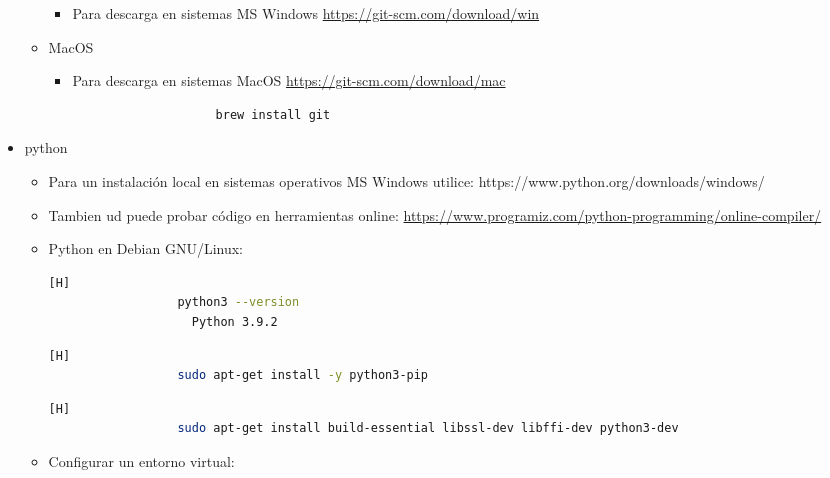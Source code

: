 \documentclass{article}
\begin{document}
\begin{itemize}
\begin{itemize}
            \begin{itemize}
                \item Para descarga en sistemas MS Windows \url{https://git-scm.com/download/win}
            \end{itemize}
            \item MacOS
            \begin{itemize}
                \item Para descarga en sistemas MacOS \url{https://git-scm.com/download/mac}
                \begin{lstlisting}
                    brew install git
                \end{lstlisting}
            \end{itemize}
        \end{itemize}
        \item python
        \begin{itemize}
            \item Para un instalación local en sistemas operativos MS Windows utilice: https://www.python.org/downloads/windows/
            \item Tambien ud puede probar código en herramientas online: \url{https://www.programiz.com/python-programming/online-compiler/}
            \item Python en Debian GNU/Linux:
            \begin{itemize}
            \begin{lstlisting}[language=bash,caption={Debian Linux viene con Python 3 y Python 2 preinstalados.}][H]
		          python3 --version
                    Python 3.9.2
	        \end{lstlisting}
            \begin{lstlisting}[language=bash,caption={Instalemos pip, una herramienta que instalará y administrará los paquetes de programación que queramos usar en nuestros proyectos de desarrollo.}][H]
		          sudo apt-get install -y python3-pip
	        \end{lstlisting}
            \begin{lstlisting}[language=bash,caption={Paquetes y herramientas de desarrollo más para instalar para garantizar que tengamos una configuración sólida para nuestro entorno de programación:}][H]
		          sudo apt-get install build-essential libssl-dev libffi-dev python3-dev
	        \end{lstlisting}
            \end{itemize}
            \item Configurar un entorno virtual:

\end{itemize}
\end{itemize}
\end{document}
